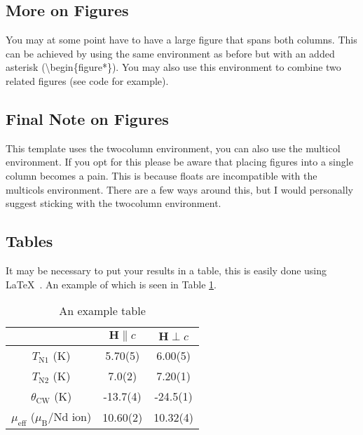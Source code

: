 \documentclass[a4paper,12pt, notitlepage]{article}
\begin{document}
\subsection{More on Figures}
You may at some point have to have a large figure that spans both columns. This can be achieved by using the same environment as before but with an added asterisk (\textbackslash begin\{figure*\}). You may also use this environment to combine two related figures (see code for example).

\subsection{Final Note on Figures}
This template uses the twocolumn environment, you can also use the multicol environment. If you opt for this please be aware that placing figures into a single column becomes a pain. This is because floats are incompatible with the multicols environment. There are a few ways around this, but I would personally suggest sticking with the twocolumn environment.

\subsection{Tables}
\label{table}
It may be necessary to put your results in a table, this is easily done using \LaTeX\ . An example of which is seen in Table \ref{tab: tab_1}.

\begin{table}[h]
\centering
\begin{tabular}{ c c c }
\hline 
 & $\mathbf{H} \parallel c$ & $\mathbf{H} \perp c$ \\ 
\hline 
$T_{\mathrm{N1}}$ (K) & 5.70(5) &  6.00(5) \\ 
$T_{\mathrm{N2}}$ (K) & 7.0(2) & 7.20(1) \\  
$\theta_{\mathrm{CW}}$ (K) & -13.7(4) & -24.5(1) \\  
$\mu_{\mathrm{eff}}$ ($\mu_{\mathrm{B}}$/Nd ion) & 10.60(2) & 10.32(4)  \\ 
\hline 
\end{tabular}
\caption{An example table}
\label{tab: tab_1}
\end{table} 

\end{document}
